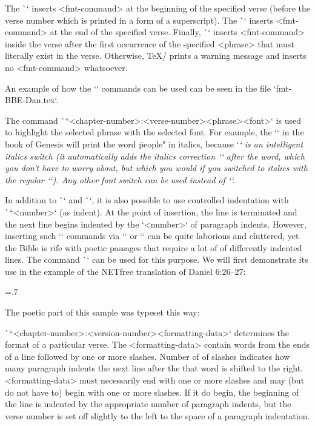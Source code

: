 {%
The \`\fmtpre`  inserts <fmt-command>
at the beginning of the specified verse (before the verse number which is printed in a form 
of a superscript). 
The \`\fmtadd`  inserts <fmt-command> at the end of the specified verse.
Finally, \`\fmtins` inserts <fmt-command> inside the verse after the first occurrence of the 
specified <phrase> that must literally exist in the verse. Otherwise, \TeX/ prints a warning 
message and inserts no <fmt-command> whatsoever.

An example of how the `\fmt*` commands can be used can be seen in the file
`fmt-BBE-Dan.tex`.

The command \`\fmtfont``{<chapter-number>:<verse-number>}{<phrase>}{<font>}`
is used to highlight the selected phrase with the selected font.
For example, the `` in the book of Genesis will print the word
\"people"  in italics, because `\em` is an intelligent italics switch (it automatically adds the italics correction `\/` after the word, which you don't have to worry about, but which you would if you switched to italics with the regular `\it`).
Any other font switch can be used instead of `\em`.

In addition to \`\begcenter` and \`\endcenter`, it is also possible to use controlled 
indentation with \`\ind``<number>` (as indent). 
At the point of insertion, the line is terminated and the next line begins indented by the
`<number>` of paragraph indents. However, inserting such `\ind` commands
via `\fmtins` or `\fmtpre` can be quite laborious and
cluttered, yet the Bible is rife with poetic passages that require a lot of
of differently indented lines. The command \`\fmtpoetry` can be used for this purpose.
We will first demonstrate its use in the example of the NETfree translation of 
Daniel 6:26--27:

\medskip
\centerline{\picw=.7\hsize{} }
\vskip-2pt %



The poetic part of this sample was typeset this way:
\begtt
{}
\endtt








\`\fmtpoetry``{<chapter-number>:<version-number>}{<formatting-data>}` determines the 
format of a particular verse. The <formatting-data>
contain words from the ends of a line followed by one or more slashes. Number of
of slashes indicates how many paragraph indents the next line after the
that word is shifted to the right. <formatting-data> must necessarily end with one or more
slashes and may (but do not have to) begin with one or more slashes.  If
it do begin, the beginning of the line is indented by the appropriate number of paragraph indents,
but the verse number is set off slightly to the left to the space of a paragraph
indentation.

}

